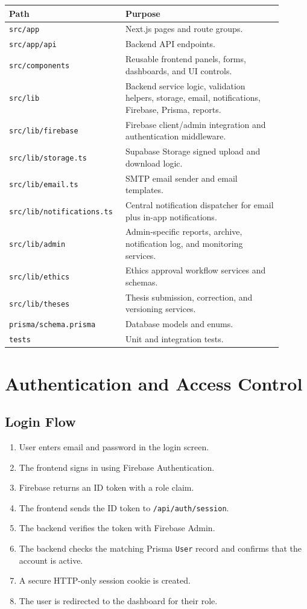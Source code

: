\documentclass[11pt,a4paper]{article}
\newcommand{\code}[1]{\texttt{#1}}
\newcommand{\file}[1]{\texttt{#1}}
\begin{document}
\begin{longtable}{p{0.35\linewidth} p{0.55\linewidth}}
\toprule
\textbf{Path} & \textbf{Purpose} \\
\midrule
\file{src/app} & Next.js pages and route groups. \\
\file{src/app/api} & Backend API endpoints. \\
\file{src/components} & Reusable frontend panels, forms, dashboards, and UI controls. \\
\file{src/lib} & Backend service logic, validation helpers, storage, email, notifications, Firebase, Prisma, reports. \\
\file{src/lib/firebase} & Firebase client/admin integration and authentication middleware. \\
\file{src/lib/storage.ts} & Supabase Storage signed upload and download logic. \\
\file{src/lib/email.ts} & SMTP email sender and email templates. \\
\file{src/lib/notifications.ts} & Central notification dispatcher for email plus in-app notifications. \\
\file{src/lib/admin} & Admin-specific reports, archive, notification log, and monitoring services. \\
\file{src/lib/ethics} & Ethics approval workflow services and schemas. \\
\file{src/lib/theses} & Thesis submission, correction, and versioning services. \\
\file{prisma/schema.prisma} & Database models and enums. \\
\file{tests} & Unit and integration tests. \\
\bottomrule
\end{longtable}

\section{Authentication and Access Control}

\subsection{Login Flow}

\begin{enumerate}
  \item User enters email and password in the login screen.
  \item The frontend signs in using Firebase Authentication.
  \item Firebase returns an ID token with a role claim.
  \item The frontend sends the ID token to \file{/api/auth/session}.
  \item The backend verifies the token with Firebase Admin.
  \item The backend checks the matching Prisma \code{User} record and confirms that the account is active.
  \item A secure HTTP-only session cookie is created.
  \item The user is redirected to the dashboard for their role.
\end{enumerate}
\end{document}
